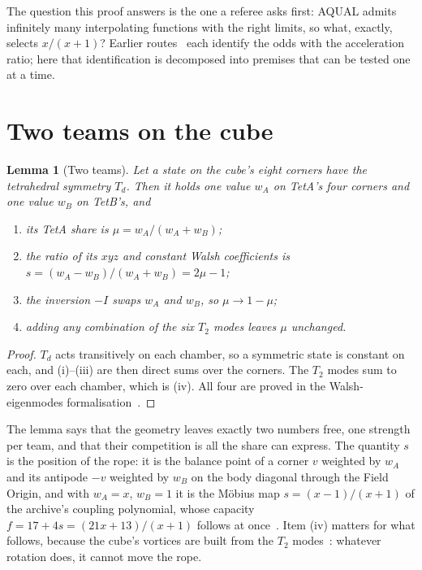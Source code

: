 \documentclass[twocolumn]{iopjournal}
\newtheorem{lemma}{Lemma}
\theoremstyle{definition}
\theoremstyle{remark}
\begin{document}
The question this proof answers is the one a referee asks first: AQUAL
admits infinitely many interpolating functions with the right limits, so
what, exactly, selects $x/(x+1)$? Earlier routes~\cite{NelsonCL,NelsonCLL}
each identify the odds with the acceleration ratio; here that
identification is decomposed into premises that can be tested one at a
time.

\section*{Two teams on the cube}

\begin{lemma}[Two teams]\label{lem:teams}
Let a state on the cube's eight corners have the tetrahedral symmetry
$T_d$. Then it holds one value $w_A$ on TetA's four corners and one value
$w_B$ on TetB's, and
\begin{enumerate}
\item[(i)] its TetA share is $\mu = w_A/(w_A + w_B)$;
\item[(ii)] the ratio of its $xyz$ and constant Walsh coefficients is
  $s = (w_A - w_B)/(w_A + w_B) = 2\mu - 1$;
\item[(iii)] the inversion $-I$ swaps $w_A$ and $w_B$, so $\mu \to 1-\mu$;
\item[(iv)] adding any combination of the six $T_2$ modes leaves $\mu$
  unchanged.
\end{enumerate}
\end{lemma}

\begin{proof}
$T_d$ acts transitively on each chamber, so a symmetric state is constant
on each, and (i)--(iii) are then direct sums over the corners. The $T_2$
modes sum to zero over each chamber, which is (iv). All four are proved in
the Walsh-eigenmodes formalisation~\cite{NelsonWalsh}.
\end{proof}

The lemma says that the geometry leaves exactly two numbers free, one
strength per team, and that their competition is all the share can
express. The quantity $s$ is the position of the rope: it is the balance
point of a corner $v$ weighted by $w_A$ and its antipode $-v$ weighted by
$w_B$ on the body diagonal through the Field Origin, and with $w_A = x$,
$w_B = 1$ it is the Möbius map $s = (x-1)/(x+1)$ of the archive's coupling
polynomial, whose capacity $f = 17 + 4s = (21x+13)/(x+1)$ follows
at once~\cite{NelsonDocs}. Item (iv) matters for what follows, because the
cube's vortices are built from the $T_2$ modes~\cite{NelsonWalsh}: whatever
rotation does, it cannot move the rope.
\end{document}
